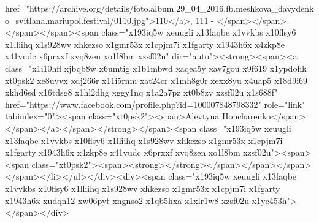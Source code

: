 href="https://archive.org/details/foto.album.29_04_2016.fb.meshkova_davydenko_svitlana.mariupol.festival/0110.jpg">110</a>, 111 - </span></span></span></span><span class="x193iq5w xeuugli x13faqbe x1vvkbs x10flsy6 x1lliihq x1s928wv xhkezso x1gmr53x x1cpjm7i x1fgarty x1943h6x x4zkp8e x41vudc x6prxxf xvq8zen xo1l8bm xzsf02u" dir="auto"><strong><span><a class="x1i10hfl xjbqb8w x6umtig x1b1mbwd xaqea5y xav7gou x9f619 x1ypdohk xt0psk2 xe8uvvx xdj266r x11i5rnm xat24cr x1mh8g0r xexx8yu x4uap5 x18d9i69 xkhd6sd x16tdsg8 x1hl2dhg xggy1nq x1a2a7pz xt0b8zv xzsf02u x1s688f" href="https://www.facebook.com/profile.php?id=100007848798332" role="link" tabindex="0"><span class="xt0psk2"><span>Alevtyna Honcharenko</span></span></a></span></strong></span><span class="x193iq5w xeuugli x13faqbe x1vvkbs x10flsy6 x1lliihq x1s928wv xhkezso x1gmr53x x1cpjm7i x1fgarty x1943h6x x4zkp8e x41vudc x6prxxf xvq8zen xo1l8bm xzsf02u"><span><span class="xt0psk2"><span><strong></strong></span></span></span></span></li></ul></div><div><span class="x193iq5w xeuugli x13faqbe x1vvkbs x10flsy6 x1lliihq x1s928wv xhkezso x1gmr53x x1cpjm7i x1fgarty x1943h6x xudqn12 xw06pyt xngnso2 x1qb5hxa x1xlr1w8 xzsf02u x1yc453h"></span></div>
